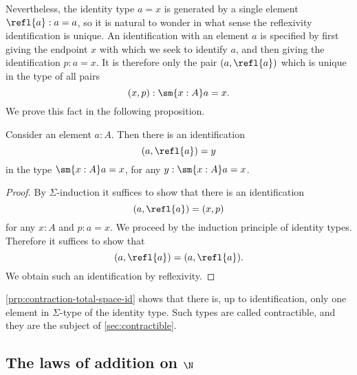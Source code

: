 Nevertheless, the identity type $a=x$ is generated by a single element $\refl{a}:a=a$, so it is natural to wonder in what sense the reflexivity identification is unique. An identification with an element $a$ is specified by first giving the endpoint $x$ with which we seek to identify $a$, and then giving the identification $p:a=x$. It is therefore only the pair $(a,\refl{a})$ which is unique in the type of all pairs
\begin{equation*}
  (x,p):\sm{x:A}a=x.
\end{equation*}
We prove this fact in the following proposition.

\begin{prp}\label{prp:contraction-total-space-id}
  Consider an element $a:A$. Then there is an identification
  \begin{equation*}
    (a,\refl{a})=y
  \end{equation*}
  in the type $\sm{x:A}a=x$, for any $y:\sm{x:A}a=x$.
\end{prp}

\begin{proof}
  By $\Sigma$-induction it suffices to show that there is an identification
  \begin{equation*}
    (a,\refl{a})=(x,p)
  \end{equation*}
  for any $x:A$ and $p:a=x$. We proceed by the induction principle of identity types.
  Therefore it suffices to show that
  \begin{equation*}
    (a,\refl{a})=(a,\refl{a}).
  \end{equation*}
  We obtain such an identification by reflexivity.
\end{proof}

\cref{prp:contraction-total-space-id} shows that there is, up to identification, only one element in $\Sigma$-type of the identity type. Such types are called contractible, and they are the subject of \cref{sec:contractible}.

\subsection{The laws of addition on \texorpdfstring{$\N$}{ℕ}}\label{subsec:addN}

